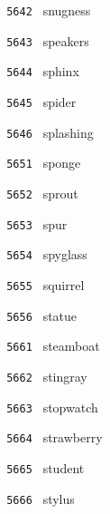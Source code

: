 \documentclass[11pt]{article}
\begin{document}
\begin{multicols}{6}
\noindent \texttt{ 5642 } \hspace{1mm} snugness  \par
\noindent \texttt{ 5643 } \hspace{1mm} speakers  \par
\noindent \texttt{ 5644 } \hspace{1mm} sphinx  \par
\noindent \texttt{ 5645 } \hspace{1mm} spider  \par
\noindent \texttt{ 5646 } \hspace{1mm} splashing  \par
\noindent \texttt{ 5651 } \hspace{1mm} sponge  \par
\noindent \texttt{ 5652 } \hspace{1mm} sprout  \par
\noindent \texttt{ 5653 } \hspace{1mm} spur  \par
\noindent \texttt{ 5654 } \hspace{1mm} spyglass  \par
\noindent \texttt{ 5655 } \hspace{1mm} squirrel  \par
\noindent \texttt{ 5656 } \hspace{1mm} statue  \par
\noindent \texttt{ 5661 } \hspace{1mm} steamboat  \par
\noindent \texttt{ 5662 } \hspace{1mm} stingray  \par
\noindent \texttt{ 5663 } \hspace{1mm} stopwatch  \par
\noindent \texttt{ 5664 } \hspace{1mm} strawberry  \par
\noindent \texttt{ 5665 } \hspace{1mm} student  \par
\noindent \texttt{ 5666 } \hspace{1mm} stylus  \par
\end{multicols}
\end{document}
